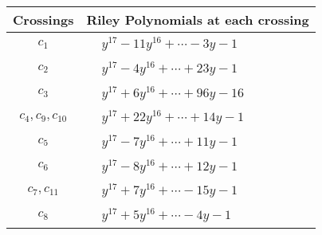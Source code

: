 \documentclass[1p]{elsarticle_modified}
\theoremstyle{definition}
\begin{document}
\begin{tabular}{m{50pt}|m{274pt}}
Crossings & \hspace{64pt}Riley Polynomials at each crossing \\
\hline $$\begin{aligned}c_{1}\end{aligned}$$&$\begin{aligned}
&y^{17}-11 y^{16}+\cdots-3 y-1
\end{aligned}$\\
\hline $$\begin{aligned}c_{2}\end{aligned}$$&$\begin{aligned}
&y^{17}-4 y^{16}+\cdots+23 y-1
\end{aligned}$\\
\hline $$\begin{aligned}c_{3}\end{aligned}$$&$\begin{aligned}
&y^{17}+6 y^{16}+\cdots+96 y-16
\end{aligned}$\\
\hline $$\begin{aligned}c_{4},c_{9},c_{10}\end{aligned}$$&$\begin{aligned}
&y^{17}+22 y^{16}+\cdots+14 y-1
\end{aligned}$\\
\hline $$\begin{aligned}c_{5}\end{aligned}$$&$\begin{aligned}
&y^{17}-7 y^{16}+\cdots+11 y-1
\end{aligned}$\\
\hline $$\begin{aligned}c_{6}\end{aligned}$$&$\begin{aligned}
&y^{17}-8 y^{16}+\cdots+12 y-1
\end{aligned}$\\
\hline $$\begin{aligned}c_{7},c_{11}\end{aligned}$$&$\begin{aligned}
&y^{17}+7 y^{16}+\cdots-15 y-1
\end{aligned}$\\
\hline $$\begin{aligned}c_{8}\end{aligned}$$&$\begin{aligned}
&y^{17}+5 y^{16}+\cdots-4 y-1
\end{aligned}$\\
\hline
\end{tabular}\\~\\
\end{document}
